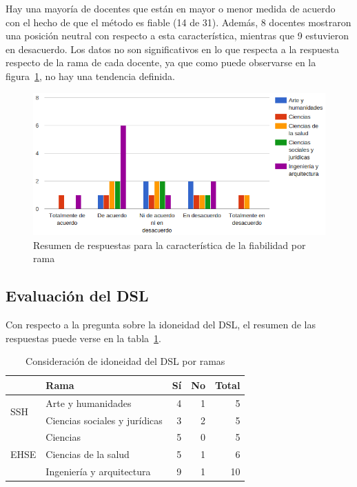 Hay una mayoría de docentes que están en mayor o menor medida de acuerdo con el hecho de que el método es fiable (14 de 31). Además, 8 docentes mostraron una posición neutral con respecto a esta característica, mientras que 9 estuvieron en desacuerdo. Los datos no son significativos en lo que respecta a la respuesta respecto de la rama de cada docente, ya que como puede observarse en la figura~\ref{fig:evalmetodo:dba:fiabilidad:rama}, no hay una tendencia definida.

\begin{figure}[h]
  \begin{center}
    \includegraphics[scale=0.45]{C_DBA_fiabilidad_rama.png}
  \end{center}
  \caption{Resumen de respuestas para la característica de la fiabilidad por rama}
  \label{fig:evalmetodo:dba:fiabilidad:rama}
\end{figure}


\subsection{Evaluación del DSL}

Con respecto a la pregunta sobre la idoneidad del DSL, el resumen de las respuestas puede verse en la tabla~\ref{tab:evalmetodo:encuesta:DSL:rama}.

\begin{table}[H]
  \begin{center}
  \begin{tabular}{| l | l | r | r | r |}
    \hline
    & Rama & Sí & No & Total \\
    \hline
    \hline
    \multirow{2}{2.5cm}{SSH} & Arte y humanidades & 4 & 1 & 5  \\
    \cline{2-5}
    & Ciencias sociales y jurídicas & 3 & 2 & 5  \\
    \hline
    \multirow{3}{2.5cm}{EHSE} & Ciencias & 5 & 0 & 5  \\
    \cline{2-5}
    & Ciencias de la salud & 5 & 1 & 6  \\
    \cline{2-5}
    & Ingeniería y arquitectura & 9 & 1 & 10 \\
    \hline
  \end{tabular}
\end{center}
\caption{Consideración de idoneidad del DSL por ramas}
\label{tab:evalmetodo:encuesta:DSL:rama}
\end{table}

